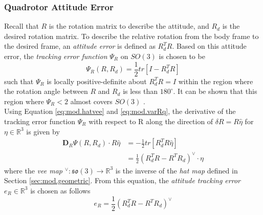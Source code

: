 \subsubsection*{Quadrotor Attitude Error}
Recall that $ R $ is the rotation matrix to describe the  attitude, and $ R_d $ is the desired rotation matrix. To describe the relative rotation from the body frame to the desired frame, an \textit{attitude error} is defined as $ R^T_dR $. 
Based on this attitude error, the \textit{tracking error function} $ \Psi_R $ on $ SO(3) $ is chosen to be 
\begin{equation}\label{eq:psiR}
\Psi_R(R,R_d)=\frac{1}{2}tr\left[I-R_d^TR\right]
\end{equation}
such that $ \Psi_R $ is locally positive-definite about $ R^T_dR=I $ within the region where the rotation angle between $ R $ and $ R_d $ is less than $ 180^\circ $. 
It can be shown that this region where $ \Psi_R<2 $ almost covers $ SO(3) $ \cite{Lee2010c}.\\
Using Equation \ref{eq:mod.hatvee} and \ref{eq:mod.varRq}, the derivative of the tracking error function $ \Psi_R $ with respect to R along the direction of $ \delta R=R\hat{\eta} $ for $ \eta\in\mathbb{R}^3 $ is given by
\begin{equation}\label{key}
\begin{aligned}
\mathbf{D}_R\Psi(R,R_d)\cdot R\hat{\eta}&=-\frac{1}{2}tr[R_d^TR\hat{\eta}]\\
&=\frac{1}{2}(R^T_dR-R^TR_d)^\vee\cdot\eta
\end{aligned}
\end{equation}
where the \textit{vee map} $ ^\vee:\mathfrak{so}(3)\rightarrow\mathbb{R}^3 $ is the inverse of the \textit{hat map} defined in Section \ref{sec:mod.geometric}. From this equation, the  \textit{attitude tracking error} $ e_R \in \mathbb{R}^3$ is chosen as follows
\begin{equation}\label{eq:con.eR}
e_R=\frac{1}{2}(R_d^TR-R^TR_d)^\vee
\end{equation}
